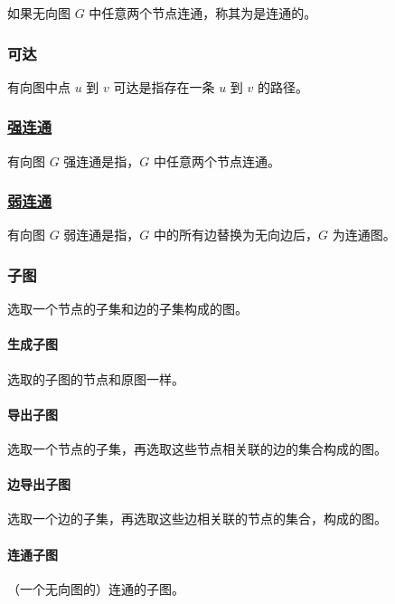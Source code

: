 如果无向图 $G$ 中任意两个节点连通，称其为是连通的。

\subsubsection{可达}

有向图中点 $u$ 到 $v$ 可达是指存在一条 $u$ 到 $v$ 的路径。

\subsubsection{\href{/graph/scc}{强连通}}

有向图 $G$ 强连通是指，$G$ 中任意两个节点连通。

\subsubsection{\href{/graph/bcc}{弱连通}}

有向图 $G$ 弱连通是指，$G$ 中的所有边替换为无向边后，$G$ 为连通图。

\subsubsection{子图}

选取一个节点的子集和边的子集构成的图。

\paragraph{生成子图}

选取的子图的节点和原图一样。

\paragraph{导出子图}

选取一个节点的子集，再选取这些节点相关联的边的集合构成的图。

\paragraph{边导出子图}

选取一个边的子集，再选取这些边相关联的节点的集合，构成的图。

\paragraph{连通子图}

（一个无向图的）连通的子图。

